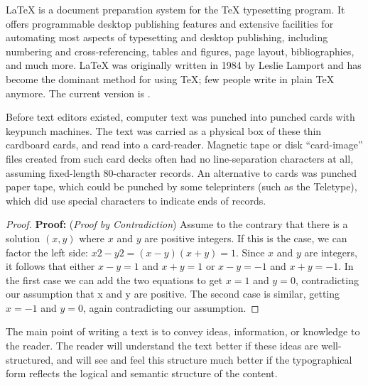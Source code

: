 \documentclass[10pt, unboxed, slabel]{homework}
\date{\today}
\begin{document}
\maketitle

\begin{problem}[Problem 1:]
\LaTeX{} is a document preparation system for the \TeX{}
  typesetting program. It offers programmable desktop
  publishing features and extensive facilities for
  automating most aspects of typesetting and desktop
  publishing, including numbering and cross-referencing,
  tables and figures, page layout, bibliographies, and
  much more. \LaTeX{} was originally written in 1984 by
  Leslie Lamport and has become the dominant method for
  using \TeX; few people write in plain \TeX{} anymore.
  The current version is \LaTeXe.
\end{problem}

\begin{solution}
 Before text editors existed, computer text was punched into punched cards with keypunch machines. The text was carried as a physical box of these thin cardboard cards, and read into a card-reader. Magnetic tape or disk ``card-image'' files created from such card decks often had no line-separation characters at all, assuming fixed-length 80-character records. An alternative to cards was punched paper tape, which could be punched by some teleprinters (such as the Teletype), which did use special characters to indicate ends of records.

\begin{proof}
{\bf Proof:} ({\it Proof by Contradiction}) Assume to the contrary that there is a solution $(x, y)$ where $x$ and $y$ are positive integers. If this is the case, we can factor the left side: $x2 - y2 = (x-y)(x+y) = 1$. Since $x$ and $y$ are integers, it follows that either $x-y = 1$ and $x+y = 1$ or $x-y = -1$ and $x+y = -1$. In the first case we can add the two equations to get $x = 1$ and $y = 0$, contradicting our assumption that x and y are positive. The second case is similar, getting $x = -1$ and $y = 0$, again contradicting our assumption. 
\end{proof}

\end{solution}

\begin{problem}[Problem 2:]
The main point of writing a text is to convey ideas, information, or knowledge to the reader. The reader will understand the text better if these ideas are well-structured, and will see and feel this structure much better if the typographical form reflects the logical and semantic structure of the content.
\end{problem}
\end{document}
